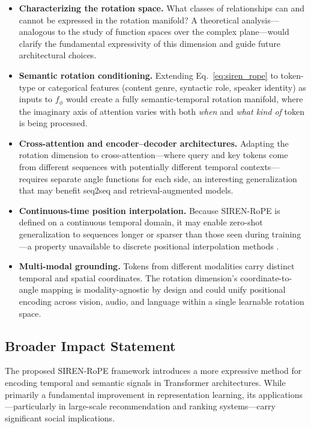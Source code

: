 \documentclass{article}
\begin{document}
\begin{itemize}
  \item \textbf{Characterizing the rotation space.} What classes of
    relationships can and cannot be expressed in the rotation manifold? A
    theoretical analysis---analogous to the study of function spaces over the
    complex plane---would clarify the fundamental expressivity of this
    dimension and guide future architectural choices.

  \item \textbf{Semantic rotation conditioning.} Extending
    Eq.~\eqref{eq:siren_rope} to token-type or categorical features (content
    genre, syntactic role, speaker identity) as inputs to $f_\phi$ would
    create a fully semantic-temporal rotation manifold, where the imaginary
    axis of attention varies with both \emph{when} and \emph{what kind of}
    token is being processed.

  \item \textbf{Cross-attention and encoder--decoder architectures.} Adapting
    the rotation dimension to cross-attention---where query and key tokens
    come from different sequences with potentially different temporal
    contexts---requires separate angle functions for each side, an interesting
    generalization that may benefit seq2seq and retrieval-augmented models.

  \item \textbf{Continuous-time position interpolation.} Because SIREN-RoPE
    is defined on a continuous temporal domain, it may enable zero-shot
    generalization to sequences longer or sparser than those seen during
    training---a property unavailable to discrete positional interpolation
    methods \citep{chen2023pi,peng2023yarn}.

  \item \textbf{Multi-modal grounding.} Tokens from different modalities
    carry distinct temporal and spatial coordinates. The rotation dimension's
    coordinate-to-angle mapping is modality-agnostic by design and could
    unify positional encoding across vision, audio, and language within a
    single learnable rotation space.
\end{itemize}

\subsection{Broader Impact Statement}

The proposed SIREN-RoPE framework introduces a more expressive method for encoding
temporal and semantic signals in Transformer architectures. While primarily a
fundamental improvement in representation learning, its applications---particularly
in large-scale recommendation and ranking systems---carry significant social
implications.
\end{document}
